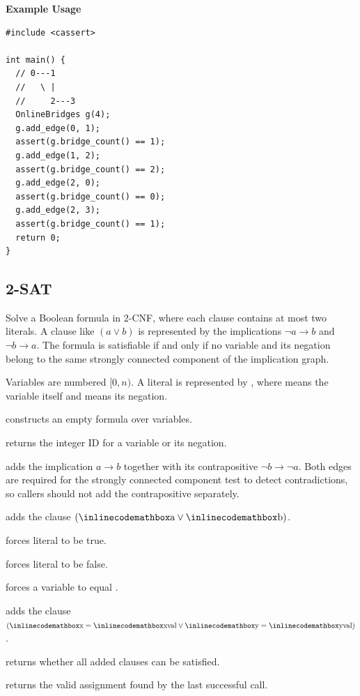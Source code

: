 \textbf{Example Usage}\par
\begin{lstlisting}[style=cpp]
#include <cassert>

int main() {
  // 0---1
  //   \ |
  //     2---3
  OnlineBridges g(4);
  g.add_edge(0, 1);
  assert(g.bridge_count() == 1);
  g.add_edge(1, 2);
  assert(g.bridge_count() == 2);
  g.add_edge(2, 0);
  assert(g.bridge_count() == 0);
  g.add_edge(2, 3);
  assert(g.bridge_count() == 1);
  return 0;
}
\end{lstlisting}
\subsection{2-SAT}
\label{sec:4.2.8}
Solve a Boolean formula in 2-CNF, where each clause contains at most two literals. A clause like $(a \lor b)$ is represented by the implications $\lnot a \rightarrow b$ and $\lnot b \rightarrow a$. The formula is satisfiable if and only if no variable and its negation belong to the same strongly connected component of the implication graph.

Variables are numbered $[0, n)$. A literal is represented by , where  means the variable itself and  means its negation.

\begin{compactitem}
  \item {} constructs an empty formula over  variables.
  \item {} returns the integer ID for a variable or its negation.
  \item {} adds the implication $a \rightarrow b$ together with its contrapositive $\lnot b \rightarrow \lnot a$. Both edges are required for the strongly connected component test to detect contradictions, so callers should not add the contrapositive separately.
  \item {} adds the clause $({\inlinecodemath{a}} \lor {\inlinecodemath{b}})$.
  \item {} forces literal  to be true.
  \item {} forces literal  to be false.
  \item {} forces a variable to equal .
  \item {} adds the clause $({\inlinecodemath{x}} = {\inlinecodemath{xval}} \lor {\inlinecodemath{y}} = {\inlinecodemath{yval}})$.
  \item {} returns whether all added clauses can be satisfied.
  \item {} returns the valid assignment found by the last successful  call.
\end{compactitem}

